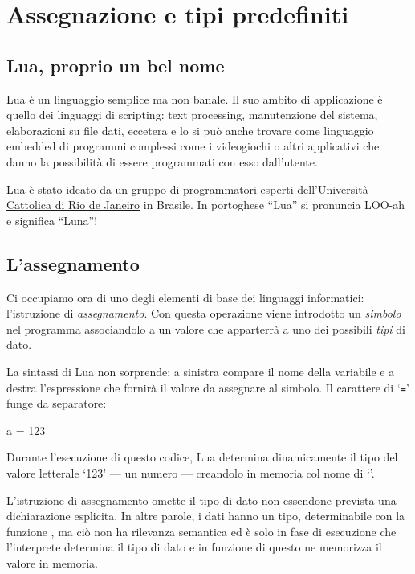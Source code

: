 
\chapter{Assegnazione e tipi predefiniti}
\label{chFondAssignment}


\section{Lua, proprio un bel nome}

Lua è un linguaggio semplice ma non banale. Il suo ambito di applicazione è
quello dei linguaggi di scripting: text processing, manutenzione del sistema,
elaborazioni su file dati, eccetera e lo si può anche trovare come linguaggio
embedded di programmi complessi come i videogiochi o altri applicativi
che danno la possibilità di essere programmati con esso dall'utente.

Lua è stato ideato da un gruppo di programmatori esperti
dell'\href{http://www.puc-rio.br/index.html}{Università Cattolica di Rio de
Janeiro} in Brasile. In portoghese ``Lua'' si pronuncia LOO-ah e significa
``Luna''!


\section{L'assegnamento}
\label{secFondAssegnamento}

Ci occupiamo ora di uno degli elementi di base dei linguaggi informatici:
l'istruzione di \emph{assegnamento}. Con questa operazione viene introdotto un
\emph{simbolo} nel programma associandolo a un valore che apparterrà a uno
dei possibili \emph{tipi} di dato.

La sintassi di Lua non sorprende: a sinistra compare il nome della variabile e
a destra l'espressione che fornirà il valore da assegnare al simbolo. Il
carattere di `\texttt{=}' funge da separatore:
\begin{lines}
a = 123
\end{lines}

Durante l'esecuzione di questo codice, Lua determina dinamicamente il tipo del
valore letterale `123' --- un numero --- creandolo in memoria col nome di
`'.

L'istruzione di assegnamento omette il tipo di dato non essendone prevista una
dichiarazione esplicita. In altre parole, i dati hanno un tipo, determinabile
con la funzione , ma ciò non ha rilevanza semantica ed è
solo in fase di esecuzione che l'interprete determina il tipo di dato e in
funzione di questo ne memorizza il valore in memoria.


